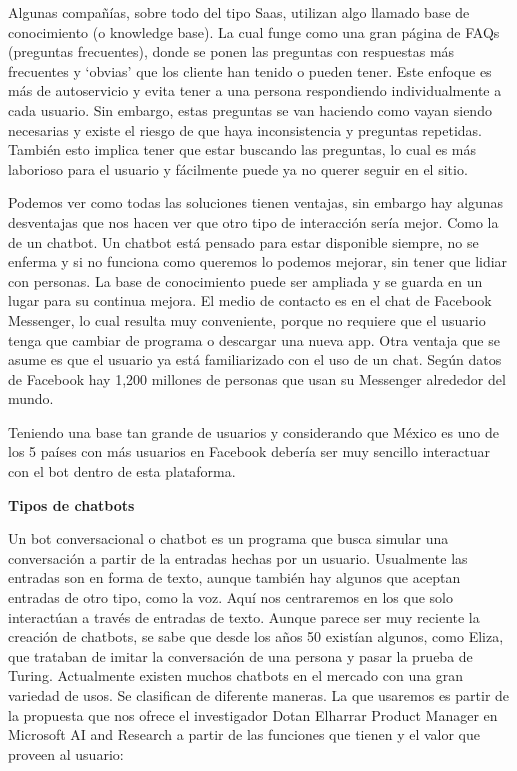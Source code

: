 Algunas compañías, sobre todo del tipo Saas, utilizan algo llamado base de conocimiento (o knowledge base). La cual funge como una gran página de FAQs (preguntas frecuentes), donde se ponen las preguntas con respuestas más frecuentes y ‘obvias’ que los cliente han tenido o pueden tener. Este enfoque es más de autoservicio y evita tener a una persona respondiendo individualmente a cada usuario. Sin embargo, estas preguntas se van haciendo como vayan siendo necesarias y existe el riesgo de que haya inconsistencia y preguntas repetidas. También esto implica tener que estar buscando las preguntas, lo cual es más laborioso para el usuario y fácilmente puede ya no querer seguir en el sitio.

Podemos ver como todas las soluciones tienen ventajas, sin embargo hay algunas  desventajas que nos hacen ver que otro tipo de interacción sería mejor. Como la de un chatbot. Un chatbot está pensado para estar disponible siempre, no se enferma y si no funciona como queremos lo podemos mejorar, sin tener que lidiar con personas. La base de conocimiento puede ser ampliada y se guarda en un lugar para su continua mejora. El medio de contacto es en el chat de Facebook Messenger, lo cual resulta muy conveniente, porque no requiere que el usuario tenga que cambiar de programa o descargar una nueva app. Otra ventaja que se asume es que el usuario ya está familiarizado con el uso de un chat. Según datos de Facebook hay 1,200 millones de personas que usan su Messenger alrededor del mundo. \cite{zuckerberg2017results}


Teniendo una base tan grande de usuarios y considerando que México es uno de los 5 países con más usuarios en Facebook debería ser muy sencillo interactuar con el bot dentro de esta plataforma.

\textbf{Tipos de chatbots}

Un bot conversacional o chatbot es un programa que busca simular una conversación a partir de la entradas hechas por un usuario. Usualmente las entradas son en forma de texto, aunque también hay algunos que aceptan entradas de otro tipo, como la voz. Aquí nos centraremos en los que solo interactúan a través de entradas de texto. Aunque parece ser muy reciente la creación de chatbots, se sabe que desde los años 50 existían algunos, como Eliza, que trataban de imitar la conversación de una persona y pasar la prueba de Turing. Actualmente existen muchos chatbots en el mercado con una gran variedad de usos. Se clasifican de diferente maneras. La que usaremos es partir de la propuesta que nos ofrece el investigador Dotan Elharrar Product Manager en Microsoft AI and Research a partir de las funciones que tienen y el valor que proveen al usuario:

